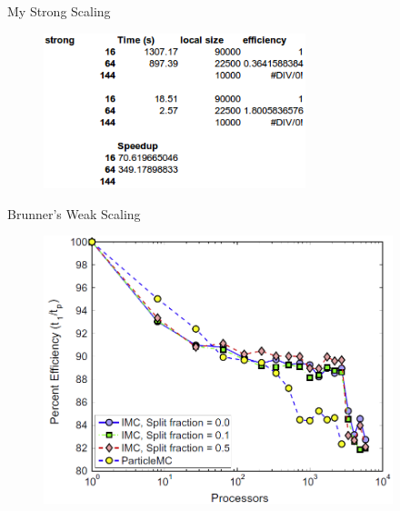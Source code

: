 \documentclass{beamer}
\begin{document}
\begin{frame}{My Strong Scaling}

  \begin{figure}[h!]
    \begin{center}
      \includegraphics[width=3in]{my_strong.png}
    \end{center}
  \end{figure}

\end{frame}

\begin{frame}{Brunner's Weak Scaling}

  \begin{figure}[h!]
    \begin{center}
      \includegraphics[width=4in]{brunner_weak.png}
    \end{center}
  \end{figure}

\end{frame}
\end{document}
